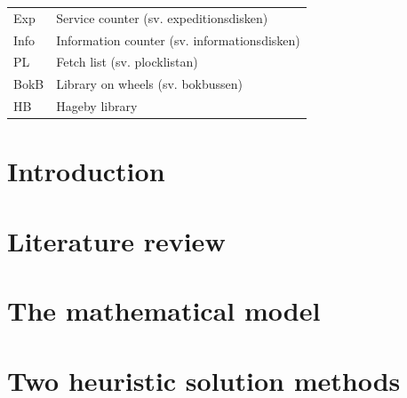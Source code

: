 \documentclass[a4paper, 10pt, twoside, openright]{book}
\begin{document}
\begin{tabular}{ll}
Exp		& Service counter (sv. expeditionsdisken) \\
Info	& Information counter (sv. informationsdisken)\\
PL		& Fetch list (sv. plocklistan)\\
BokB    & Library on wheels (sv. bokbussen)\\
HB      & Hageby library \\
\end{tabular}


\tableofcontents 
\begin{samepage}
\listoffigures
\let\clearpage\relax
\listoftables
\end{samepage}


\mainmatter


\chapter{Introduction}\label{chap:intro}



\chapter{Literature review}\label{chap:lit}



\chapter{The mathematical model}\label{chap:mathmod}



%
%

\chapter{Two heuristic solution methods}\label{chap:heur}
\end{document}
